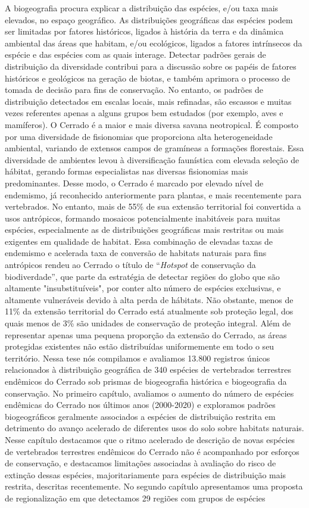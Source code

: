 \documentclass[12pt,openright,oneside,a4paper,english]{abntex2}
\begin{document}
\begin{resumo}[Resumo]
	A biogeografia procura explicar a distribuição das espécies, e/ou taxa mais elevados, no espaço geográfico. As distribuições geográficas das espécies podem ser limitadas por fatores históricos, ligados à história da terra e da dinâmica ambiental das áreas que habitam, e/ou ecológicos, ligados a fatores intrínsecos da espécie e das espécies com as quais interage. Detectar padrões gerais de distribuição da diversidade contribui para a discussão sobre os papéis de fatores históricos e geológicos na geração de biotas, e também aprimora o processo de tomada de decisão para fins de conservação. No entanto, os padrões de distribuição detectados em escalas locais, mais refinadas, são escassos e muitas vezes referentes apenas a alguns grupos bem estudados (por exemplo, aves e mamíferos). O Cerrado é a maior e mais diversa savana neotropical. É composto por uma diversidade de fisionomias que proporciona alta heterogeneidade ambiental, variando de extensos campos de gramíneas a formações florestais. Essa diversidade de ambientes levou à diversificação faunística com elevada seleção de hábitat, gerando formas especialistas nas diversas fisionomias mais predominantes. Desse modo, o Cerrado é marcado por elevado nível de endemismo, já reconhecido anteriormente para plantas, e mais recentemente para vertebrados. No entanto, mais de 55\% de sua extensão territorial foi convertida a usos antrópicos, formando mosaicos potencialmente inabitáveis para muitas espécies, especialmente as de distribuições geográficas mais restritas ou mais exigentes em qualidade de habitat. Essa combinação de elevadas taxas de endemismo e acelerada taxa de conversão de habitats naturais para fins antrópicos rendeu ao Cerrado o título de “\textit{Hotspot} de conservação da biodiverdade”, que parte da estratégia de detectar regiões do globo que são altamente "insubstituíveis", por conter alto número de espécies exclusivas, e altamente vulneráveis devido à alta perda de hábitats. Não obstante, menos de 11\% da extensão territorial do Cerrado está atualmente sob proteção legal, dos quais menos de 3\% são unidades de conservação de proteção integral. Além de representar apenas uma pequena proporção da extensão do Cerrado, as áreas protegidas existentes não estão distribuídas uniformemente em todo o seu território. Nessa tese nós compilamos e avaliamos 13.800 registros únicos relacionados à distribuição geográfica de 340 espécies de vertebrados terrestres endêmicos do Cerrado sob prismas de biogeografia histórica e biogeografia da conservação. No primeiro capítulo, avaliamos o aumento do número de espécies endêmicas do Cerrado nos últimos anos (2000-2020) e exploramos padrões biogeográficos geralmente associados a espécies de distribuição restrita em detrimento do avanço acelerado de diferentes usos do solo sobre habitats naturais. Nesse capítulo destacamos que o ritmo acelerado de descrição de novas espécies de vertebrados terrestres endêmicos do Cerrado não é acompanhado por esforços de conservação, e destacamos limitações associadas à avaliação do risco de extinção dessas espécies, majoritariamente para espécies de distribuição mais restrita, descritas recentemente. No segundo capítulo apresentamos uma proposta de regionalização em que detectamos 29 regiões com grupos de espécies 
\end{resumo}
\end{document}
